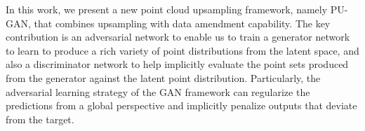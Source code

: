 


%
In this work, we present a new point cloud upsampling framework, namely PU-GAN, that combines upsampling with data amendment capability.
The key contribution is an adversarial network to enable us to train a generator network to learn to produce a rich variety of point distributions from the latent space, and also a discriminator network to help implicitly evaluate the point sets produced from the generator against the latent point distribution.
Particularly, the adversarial learning strategy of the GAN framework can regularize the predictions from a global perspective and implicitly penalize outputs that deviate from the target.


